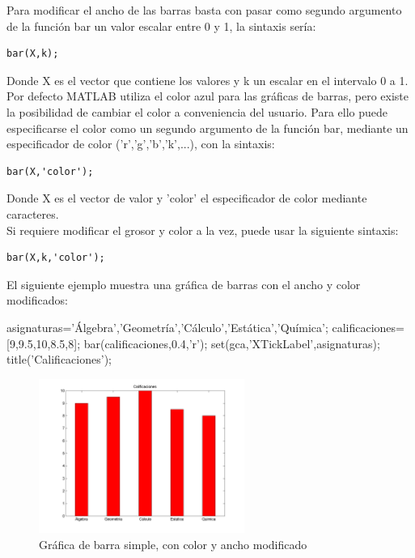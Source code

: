 Para modificar el ancho de las barras basta con pasar como segundo argumento de la función bar un 
valor escalar entre 0 y 1, la sintaxis sería:

\begin{verbatim}
bar(X,k);
\end{verbatim}

Donde X es el vector que contiene los valores y k un escalar en el intervalo 0 a 1. \\

Por defecto MATLAB utiliza el color azul para las gráficas de barras, pero existe la posibilidad 
de cambiar el color a conveniencia del usuario. Para ello puede especificarse el color como un 
segundo argumento de la función bar, mediante un especificador de color ('r','g','b','k',...), 
con la sintaxis:

\begin{verbatim}
bar(X,'color');
\end{verbatim}

Donde X es el vector de valor y 'color' el especificador de color mediante caracteres.\\

Si requiere modificar el grosor y color a la vez, puede usar la siguiente sintaxis:

\begin{verbatim}
bar(X,k,'color');
\end{verbatim}

El siguiente ejemplo muestra una gráfica de barras con el ancho y color modificados:

\begin{matlab}
asignaturas={'Álgebra','Geometría','Cálculo','Estática','Química'};
calificaciones=[9,9.5,10,8.5,8];
bar(calificaciones,0.4,'r');
set(gca,'XTickLabel',asignaturas);
title('Calificaciones');
\end{matlab}

\begin{figure}[!h]
\centering
\includegraphics[width=0.6\textwidth]{images/ch4/barra_simple_color.png}
\caption{Gráfica de barra simple, con color y ancho modificado}
\label{fig:barra_simple_color}
\end{figure}

